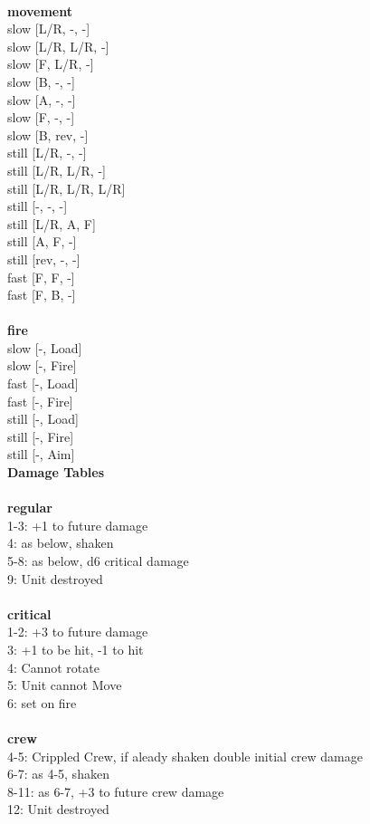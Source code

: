 \ \\ {\bf movement } \\
slow [L/R, -, -] \\
slow [L/R, L/R, -] \\
slow [F, L/R, -] \\
slow [B, -, -] \\
slow [A, -, -] \\
slow [F, -, -] \\
slow [B, rev, -] \\
still [L/R, -, -] \\
still [L/R, L/R, -] \\
still [L/R, L/R, L/R] \\
still [-, -, -] \\
still [L/R, A, F] \\
still [A, F, -] \\
still [rev, -, -] \\
fast [F, F, -] \\
fast [F, B, -] \\
\ \\ {\bf fire } \\
slow [-, Load] \\
slow [-, Fire] \\
fast [-, Load] \\
fast [-, Fire] \\
still [-, Load] \\
still [-, Fire] \\
still [-, Aim] \\


{\bf Damage Tables} \\
\ \\ {\bf regular } \\
1-3: +1 to future damage \\
4: as below, shaken \\
5-8: as below, d6 critical damage \\
9: Unit destroyed \\
\ \\ {\bf critical } \\
1-2: +3 to future damage \\
3: +1 to be hit, -1 to hit \\
4: Cannot rotate \\
5: Unit cannot Move  \\
6: set on fire \\
\ \\ {\bf crew } \\
4-5: Crippled Crew, if aleady shaken double initial crew damage \\
6-7: as 4-5, shaken \\
8-11: as 6-7, +3 to future crew damage \\
12: Unit destroyed \\


